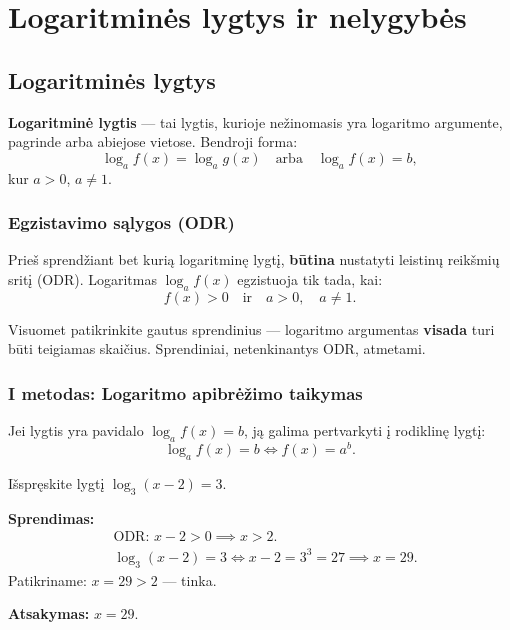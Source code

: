 \section{Logaritminės lygtys ir nelygybės}

\subsection{Logaritminės lygtys}

\begin{definition}
\textbf{Logaritminė lygtis} — tai lygtis, kurioje nežinomasis yra logaritmo argumente, pagrinde arba abiejose vietose. Bendroji forma:
\[
\log_a f(x) = \log_a g(x) \quad \text{arba} \quad \log_a f(x) = b,
\]
kur \(a > 0\), \(a \neq 1\).
\end{definition}

\subsubsection{Egzistavimo sąlygos (ODR)}

Prieš sprendžiant bet kurią logaritminę lygtį, \textbf{būtina} nustatyti leistinų reikšmių sritį (ODR). Logaritmas \(\log_a f(x)\) egzistuoja tik tada, kai:
\[
f(x) > 0 \quad \text{ir} \quad a > 0, \quad a \neq 1.
\]

\begin{tcolorbox}[colback=yellow!10, colframe=orange!60, title=\textbf{Svarbu! ODR tikrinimas}]
Visuomet patikrinkite gautus sprendinius — logaritmo argumentas \textbf{visada} turi būti teigiamas skaičius. Sprendiniai, netenkinantys ODR, atmetami.
\end{tcolorbox}

\subsubsection{I metodas: Logaritmo apibrėžimo taikymas}

Jei lygtis yra pavidalo \(\log_a f(x) = b\), ją galima pertvarkyti į rodiklinę lygtį:
\[
\log_a f(x) = b \iff f(x) = a^b.
\]

\begin{example}
Išspręskite lygtį \(\log_3(x - 2) = 3\).

\textbf{Sprendimas:}
\begin{align*}
&\text{ODR: } x - 2 > 0 \implies x > 2.\\
&\log_3(x-2) = 3 \iff x - 2 = 3^3 = 27 \implies x = 29.
\end{align*}
Patikriname: \(x = 29 > 2\) — tinka.

\textbf{Atsakymas:} \(x = 29\).
\end{example}

